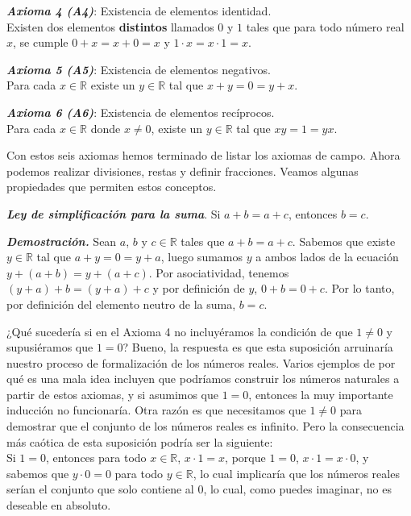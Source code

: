 \documentclass{report}
\begin{document}
    \begin{axBox}
        \textit{\textbf{Axioma 4 (A4)}}: Existencia de elementos identidad.\\
        Existen dos elementos \textbf{distintos} llamados $0$ y $1$ tales que para todo número real $x$, se cumple $0+x=x+0=x$ y $1 \cdot x = x \cdot 1 = x$.
    \end{axBox}
    
    \begin{axBox}
        \textit{\textbf{Axioma 5 (A5)}}: Existencia de elementos negativos.\\
        Para cada $x \in \mathbb{R}$ existe un $y \in \mathbb{R}$ tal que $x+y = 0 = y+x$.
    \end{axBox}
    
    \begin{axBox}
        \textit{\textbf{Axioma 6 (A6)}}: Existencia de elementos recíprocos.\\
        Para cada $x\in \mathbb{R}$ donde $x \neq 0$, existe un $y \in \mathbb{R}$ tal que $xy=1=yx$.
    \end{axBox}
    
    Con estos seis axiomas hemos terminado de listar los axiomas de campo. Ahora podemos realizar divisiones, restas y definir fracciones. Veamos algunas propiedades que permiten estos conceptos.

    \begin{thBox}
        \textit{\textbf{Ley de simplificación para la suma}}. Si $a+b=a+c$, entonces $b=c$.
    \end{thBox}
    
    \textit{\textbf{Demostración.}} Sean $a$, $b$ y $c \in \mathbb{R}$ tales que $a+b=a+c$. Sabemos que existe $y \in \mathbb{R}$ tal que $a+y = 0 = y+a$, luego sumamos $y$ a ambos lados de la ecuación $y+(a+b)=y+(a+c)$. Por asociatividad, tenemos $(y+a)+b=(y+a)+c$ y por definición de $y$, $0+b=0+c$. Por lo tanto, por definición del elemento neutro de la suma, $b=c$.
    
    \begin{asideBox}
        ¿Qué sucedería si en el Axioma 4 no incluyéramos la condición de que $1 \neq 0$ y supusiéramos que $1=0$? Bueno, la respuesta es que esta suposición arruinaría nuestro proceso de formalización de los números reales. Varios ejemplos de por qué es una mala idea incluyen que podríamos construir los números naturales a partir de estos axiomas, y si asumimos que $1=0$, entonces la muy importante inducción no funcionaría. Otra razón es que necesitamos que $1 \neq 0$ para demostrar que el conjunto de los números reales es infinito. Pero la consecuencia más caótica de esta suposición podría ser la siguiente:\\
    
        Si $1=0$, entonces para todo $x \in \mathbb{R}$, $x\cdot 1 = x$, porque $1 = 0$, $x \cdot 1 = x \cdot 0$, y sabemos que $y \cdot 0 = 0$ para todo $y \in \mathbb{R}$, lo cual implicaría que los números reales serían el conjunto que solo contiene al $0$, lo cual, como puedes imaginar, no es deseable en absoluto.
    \end{asideBox}
    
\end{document}

